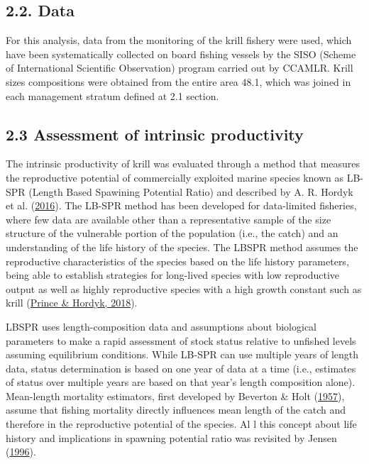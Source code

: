 \documentclass[
]{article}
\begin{document}
\hypertarget{data}{%
\subsection{2.2. Data}\label{data}}

For this analysis, data from the monitoring of the krill fishery were
used, which have been systematically collected on board fishing vessels
by the SISO (Scheme of International Scientific Observation) program
carried out by CCAMLR. Krill sizes compositions were obtained from the
entire area 48.1, which was joined in each management stratum defined at
2.1 section.

\hypertarget{assessment-of-intrinsic-productivity}{%
\subsection{2.3 Assessment of intrinsic
productivity}\label{assessment-of-intrinsic-productivity}}

The intrinsic productivity of krill was evaluated through a method that
measures the reproductive potential of commercially exploited marine
species known as LB-SPR (Length Based Spawining Potential Ratio) and
described by A. R. Hordyk et al.
(\protect\hyperlink{ref-Hordyk2016}{2016}). The LB-SPR method has been
developed for data-limited fisheries, where few data are available other
than a representative sample of the size structure of the vulnerable
portion of the population (i.e., the catch) and an understanding of the
life history of the species. The LBSPR method assumes the reproductive
characteristics of the species based on the life history parameters,
being able to establish strategies for long-lived species with low
reproductive output as well as highly reproductive species with a high
growth constant such as krill (\protect\hyperlink{ref-Prince2018}{Prince
\& Hordyk, 2018}).

LBSPR uses length-composition data and assumptions about biological
parameters to make a rapid assessment of stock status relative to
unfished levels assuming equilibrium conditions. While LB-SPR can use
multiple years of length data, status determination is based on one year
of data at a time (i.e., estimates of status over multiple years are
based on that year's length composition alone). Mean-length mortality
estimators, first developed by Beverton \& Holt
(\protect\hyperlink{ref-Beverton1957}{1957}), assume that fishing
mortality directly influences mean length of the catch and therefore in
the reproductive potential of the species. Al l this concept about life
history and implications in spawning potential ratio was revisited by
Jensen (\protect\hyperlink{ref-Jensen1996}{1996}).
\end{document}
